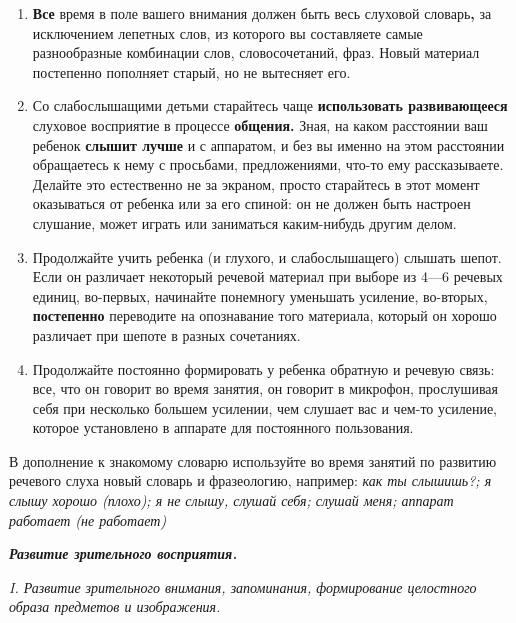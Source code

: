 \documentclass[a5paper]{book}
\renewcommand{\emph}[1]{\textit{#1}}
\begin{document}
\begin{enumerate}
\def\labelenumi{\arabic{enumi}.}
\setcounter{enumi}{2}
\item
  
  \textbf{Все} время в поле вашего внимания должен быть весь слуховой
  словарь\textbf{,} за исключением лепетных слов, из которого вы
  составляете самые разнообразные комбинации слов, словосочетаний, фраз.
  Новый материал постепенно пополняет старый, но не вытесняет его.
  
\item
  
  Со слабослышащими детьми старайтесь чаще \textbf{использовать
  развивающееся} слуховое восприятие в процессе \textbf{общения.} Зная,
  на каком расстоянии ваш ребенок \textbf{слышит лучше} и с аппаратом, и
  без вы именно на этом расстоянии обращаетесь к нему с просьбами,
  предложениями, что-то ему рассказываете. Делайте это естественно не за
  экраном, просто старайтесь в этот момент оказываться от ребенка или за
  его спиной: он не должен быть настроен слушание, может играть или
  заниматься каким-нибудь другим делом.
  
\item
  
  Продолжайте учить ребенка (и глухого, и слабослышащего) слышать шепот.
  Если он различает некоторый речевой материал при выборе из 4---6
  речевых единиц, во-первых, начинайте понемногу уменьшать усиление,
  во-вторых, \textbf{постепенно} переводите на опознавание того
  материала, который он хорошо различает при шепоте в разных сочетаниях.
  
\item
  
  Продолжайте постоянно формировать у ребенка обратную и речевую связь:
  все, что он говорит во время занятия, он говорит в микрофон,
  прослушивая себя при несколько большем усилении, чем слушает вас и
  чем-то усиление, которое установлено в аппарате для постоянного
  пользования.
  
\end{enumerate}


В дополнение к знакомому словарю используйте во время занятий по
развитию речевого слуха новый словарь и фразеологию, например: \emph{как
ты слышишь?; я слышу хорошо (плохо); я не слышу, слушай себя; слушай
меня; аппарат работает (не работает)}

\emph{\textbf{Развитие зрительного восприятия.}}

\emph{I. Развитие зрительного внимания, запоминания, формирование
целостного образа предметов и изображения.}
\end{document}
